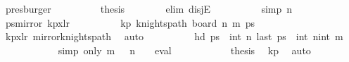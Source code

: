 \begin{isabellebody}
\ presburger\isanewline
\ \ \ \ \ \ \isamarkupfalse%
\ \isamarkupfalse%
\ {\isacharquery}{\kern0pt}thesis\isanewline
\ \ \ \ \ \ \isamarkupfalse%
\ {\isacharparenleft}{\kern0pt}elim\ disjE{\isacharparenright}{\kern0pt}\isanewline
\ \ \ \ \ \ \ \ \isamarkupfalse%
\ {\isacharbrackleft}{\kern0pt}simp{\isacharbrackright}{\kern0pt}{\isacharcolon}{\kern0pt}\ {\isachardoublequoteopen}n\ {\isacharequal}{\kern0pt}\ {}{\isachardoublequoteclose}\isanewline
\ \ \ \ \ \ \ \ \isamarkupfalse%
\ {\isacharquery}{\kern0pt}ps{\isacharequal}{\kern0pt}{\isachardoublequoteopen}mirror{}\ kp{}x{}lr{\isachardoublequoteclose}\isanewline
\ \ \ \ \ \ \ \ \isamarkupfalse%
\ kp{\isacharcolon}{\kern0pt}\ {\isachardoublequoteopen}knights{\isacharunderscore}{\kern0pt}path\ {\isacharparenleft}{\kern0pt}board\ n\ m{\isacharparenright}{\kern0pt}\ {\isacharquery}{\kern0pt}ps{\isachardoublequoteclose}\isanewline
\ \ \ \ \ \ \ \ \ \ \isamarkupfalse%
\ kp{\isacharunderscore}{\kern0pt}{}x{}{\isacharunderscore}{\kern0pt}lr\ mirror{}{\isacharunderscore}{\kern0pt}knights{\isacharunderscore}{\kern0pt}path\ \isamarkupfalse%
\ auto\isanewline
\ \ \ \ \ \ \ \ \isamarkupfalse%
\ {\isachardoublequoteopen}hd\ {\isacharquery}{\kern0pt}ps\ {\isacharequal}{\kern0pt}\ {\isacharparenleft}{\kern0pt}int\ n{\isacharcomma}{\kern0pt}{}{\isacharparenright}{\kern0pt}{\isachardoublequoteclose}\ {\isachardoublequoteopen}last\ {\isacharquery}{\kern0pt}ps\ {\isacharequal}{\kern0pt}\ {\isacharparenleft}{\kern0pt}int\ n{\isacharminus}{\kern0pt}{}{\isacharcomma}{\kern0pt}int\ m{\isacharminus}{\kern0pt}{}{\isacharparenright}{\kern0pt}{\isachardoublequoteclose}\isanewline
\ \ \ \ \ \ \ \ \ \ \isamarkupfalse%
\ {\isacharparenleft}{\kern0pt}simp\ only{\isacharcolon}{\kern0pt}\ {\isacartoucheopen}m\ {\isacharequal}{\kern0pt}\ {}{\isacartoucheclose}\ {\isacartoucheopen}n\ {\isacharequal}{\kern0pt}\ {}{\isacartoucheclose}\ {\isacharbar}{\kern0pt}\ eval{\isacharparenright}{\kern0pt}{\isacharplus}{\kern0pt}\isanewline
\ \ \ \ \ \ \ \ \isamarkupfalse%
\ \isamarkupfalse%
\ {\isacharquery}{\kern0pt}thesis\ \isamarkupfalse%
\ kp\ \isamarkupfalse%
\ auto\isanewline
\ \ \ \ \ \ \isamarkupfalse%
\isanewline
\ \ \ \ \ \ \ \ \isamarkupfalse%

\end{isabellebody}

